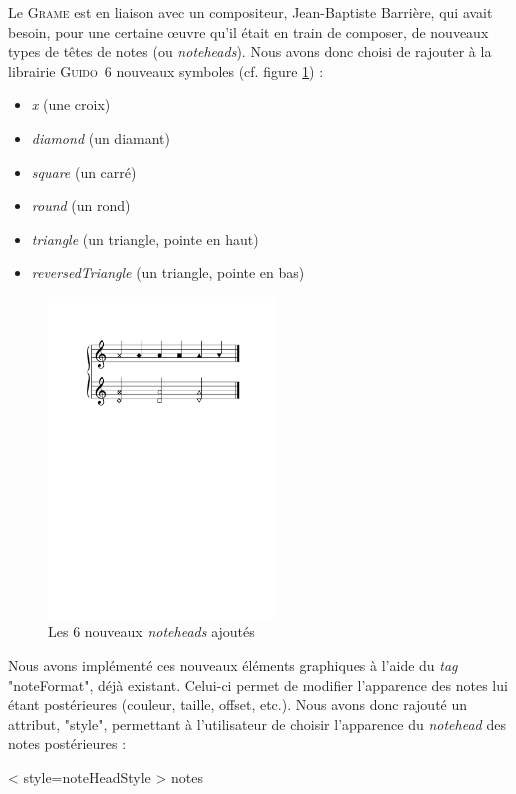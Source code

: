 \documentclass{article}
\newenvironment{gmncode}	{\vspace{-2mm}\small\verbatim}{\endverbatim\vspace{-2mm}}
\newcommand{\guido}			{\textsc{Guido}}
\begin{document}
Le \textsc{Grame} est en liaison avec un compositeur, Jean-Baptiste Barrière, qui avait besoin, pour une certaine œuvre qu'il était en train de composer, de nouveaux types de têtes de notes (ou \emph{noteheads}).
Nous avons donc choisi de rajouter à la librairie \guido\ 6 nouveaux symboles (cf. figure \ref{fig:noteheads}) :
%
\begin{itemize}
    \item \emph{x} (une croix)
    \item \emph{diamond} (un diamant)
    \item \emph{square} (un carré)
    \item \emph{round} (un rond)
    \item \emph{triangle} (un triangle, pointe en haut)
    \item \emph{reversedTriangle} (un triangle, pointe en bas)
\end{itemize} 
\bigskip
%
\begin{figure}[h]
\centering
\includegraphics[width=6cm]{img/partitions/noteheads.pdf}
\caption{Les 6 nouveaux \emph{noteheads} ajoutés}
\label{fig:noteheads}
\end{figure}
%
Nous avons implémenté ces nouveaux éléments graphiques à l'aide du \emph{tag} "noteFormat", déjà existant. Celui-ci permet de modifier l'apparence des notes lui étant postérieures (couleur, taille, offset, etc.). Nous avons donc rajouté un attribut, "style", permettant à l'utilisateur de choisir l'apparence du \emph{notehead} des notes postérieures :

\begin{gmncode}
\noteFormat< style=noteHeadStyle > notes
\end{gmncode}

%
\end{document}
